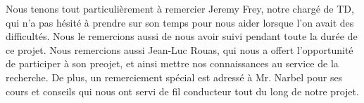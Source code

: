 \begin{thanks_perso}
Nous tenons tout particulièrement à remercier Jeremy Frey, notre chargé de TD, qui n'a pas hésité à prendre sur son temps pour nous aider lorsque l'on avait des difficultés. Nous le remercions aussi de nous avoir suivi pendant toute la durée de ce projet.
Nous remercions aussi Jean-Luc Rouas, qui nous a offert l'opportunité de participer à son preojet, et ainsi mettre nos connaissances au service de la recherche.
De plus, un remerciement spécial est adressé à Mr. Narbel pour ses cours et conseils qui nous ont servi de fil conducteur tout du long de notre projet.
\end{thanks_perso}